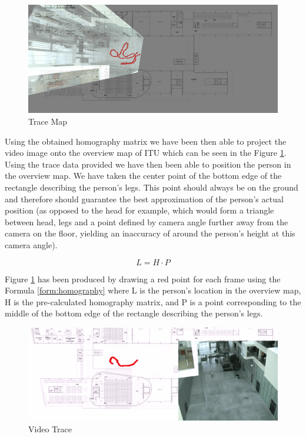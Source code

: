 \begin{figure}[h!]
	\centering
	\includegraphics[width=\textwidth]{final/images/trace_map.png}
	\caption{Trace Map}
	\label{fig:trace}
\end{figure}

Using the obtained homography matrix we have been then able to project the video image onto the overview map of ITU which can be seen in the Figure \ref{fig:trace}. Using the trace data provided we have then been able to position the person in the overview map. We have taken the center point of the bottom edge of the rectangle describing the person's legs. This point should always be on the ground and therefore should guarantee the best approximation of the person's actual position (as opposed to the head for example, which would form a triangle between head, legs and a point defined by camera angle further away from the camera on the floor, yielding an inaccuracy of around the person's height at this camera angle).

\begin{equation}
	L = H \cdot P
	\label{form:homography}
\end{equation}

Figure \ref{fig:trace} has been produced by drawing a red point for each frame using the Formula \ref{form:homography} where L is the person's location in the overview map, H is the pre-calculated homography matrix, and P is a point corresponding to the middle of the bottom edge of the rectangle describing the person's legs.

\begin{figure}[h!]
	\centering
	\includegraphics[width=\textwidth]{final/images/personlocationvideo.png}
	\caption{Video Trace}
	\label{fig:video_trace}
\end{figure}

